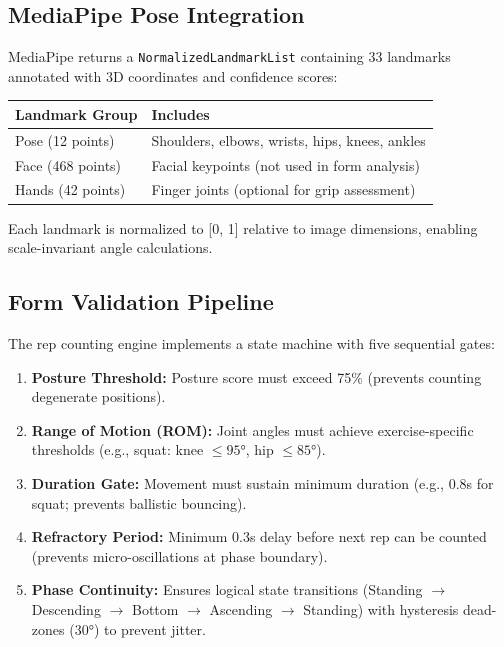\documentclass[12pt,a4paper]{article}
\begin{document}
\subsection{MediaPipe Pose Integration}

MediaPipe returns a \texttt{NormalizedLandmarkList} containing 33 landmarks 
annotated with 3D coordinates and confidence scores:

\begin{longtable}{p{3.5cm} p{9cm}}
\toprule
\textbf{Landmark Group} & \textbf{Includes} \\
\midrule
\endhead
Pose (12 points) & Shoulders, elbows, wrists, hips, knees, ankles \\
Face (468 points) & Facial keypoints (not used in form analysis) \\
Hands (42 points) & Finger joints (optional for grip assessment) \\
\bottomrule
\end{longtable}

Each landmark is normalized to [0, 1] relative to image dimensions, enabling 
scale-invariant angle calculations.

\subsection{Form Validation Pipeline}

The rep counting engine implements a state machine with five sequential gates:

\begin{enumerate}[noitemsep, topsep=2pt]
  \item \textbf{Posture Threshold:} Posture score must exceed 75\% (prevents 
        counting degenerate positions).
  
  \item \textbf{Range of Motion (ROM):} Joint angles must achieve exercise-specific 
        thresholds (e.g., squat: knee $\leq 95°$, hip $\leq 85°$).
  
  \item \textbf{Duration Gate:} Movement must sustain minimum duration (e.g., 0.8s 
        for squat; prevents ballistic bouncing).
  
  \item \textbf{Refractory Period:} Minimum 0.3s delay before next rep can be 
        counted (prevents micro-oscillations at phase boundary).
  
  \item \textbf{Phase Continuity:} Ensures logical state transitions (Standing 
        $\rightarrow$ Descending $\rightarrow$ Bottom $\rightarrow$ Ascending $\rightarrow$ 
        Standing) with hysteresis dead-zones (30°) to prevent jitter.
\end{enumerate}
\end{document}
